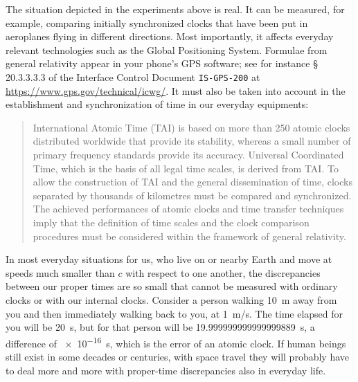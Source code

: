 \documentclass[a4paper,12pt,%
onecolumn,oneside,titlepage,%
british%
]{memoir}
\renewcommand*{\|}[1][]{\nonscript\:#1\vert\nonscript\:\mathopen{}}
\newcommand*{\sect}{\S}%
\begin{document}
The situation depicted in the experiments above is real. It can be measured, for example, comparing initially synchronized clocks that have been put in aeroplanes flying in different directions. Most importantly, it affects everyday relevant technologies such as the Global Positioning System. Formulae from general relativity appear in your phone's GPS software; see for instance \sect\,20.3.3.3.3 of the Interface Control Document \texttt{IS-GPS-200} at \url{https://www.gps.gov/technical/icwg/}. It must also be taken into account in the establishment and synchronization of time in our everyday equipments:
\begin{quote}\footnotesize
  International Atomic Time (TAI) is based on more than 250 atomic clocks distributed worldwide that provide its stability, whereas a small number of primary frequency standards provide its accuracy. Universal Coordinated Time, which is the basis of all legal time scales, is derived from TAI. To allow the construction of TAI and the general dissemination of time, clocks separated by thousands of kilometres must be compared and synchronized. \textelp{} The achieved performances of atomic clocks and time transfer techniques imply that the definition of time scales and the clock comparison procedures must be considered within the framework of general relativity. 
\end{quote}

In most everyday situations for us, who live on or nearby Earth and move at speeds much smaller than $c$ with respect to one another, the discrepancies between our proper times are so small that cannot be
measured with ordinary clocks or with our internal clocks. Consider a
person walking \qty{10}{m} away from you and then immediately walking back
to you, at \qty{1}{m/s}. The time elapsed for you will be \qty{20}{s}, but for that person
will be \qty{19.999999999999999889}{s}, a difference of \qty{e-16}{s}, which is the error of an atomic clock. %
If human beings still exist in some decades or centuries, with space travel they will probably have to deal more and more with proper-time discrepancies also in everyday life.
\end{document}
